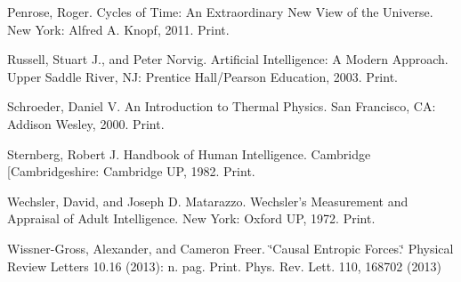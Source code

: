 \documentclass[english]{article}
\begin{document}
\begin{thebibliography}{10}
Penrose, Roger. Cycles of Time: An Extraordinary New
View of the Universe. New York: Alfred A. Knopf, 2011. Print.

Russell, Stuart J., and Peter Norvig. Artificial Intelligence:
A Modern Approach. Upper Saddle River, NJ: Prentice Hall/Pearson Education,
2003. Print.

Schroeder, Daniel V. An Introduction to Thermal Physics.
San Francisco, CA: Addison Wesley, 2000. Print.

Sternberg, Robert J. Handbook of Human Intelligence.
Cambridge {[}Cambridgeshire: Cambridge UP, 1982. Print.

Wechsler, David, and Joseph D. Matarazzo. Wechsler's
Measurement and Appraisal of Adult Intelligence. New York: Oxford
UP, 1972. Print.

Wissner-Gross, Alexander, and Cameron Freer. \char`\"{}Causal
Entropic Forces.\char`\"{} Physical Review Letters 10.16 (2013): n.
pag. Print. Phys. Rev. Lett. 110, 168702 (2013) \end{thebibliography}
\end{document}
